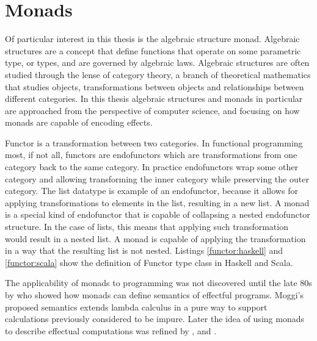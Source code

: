 



\section{Monads} \label{monads}
Of particular interest in this thesis is the algebraic structure monad. Algebraic structures are a concept that define functions that operate on some parametric type, or types, and are governed by algebraic laws. Algebraic structures are often studied through the lense of category theory, a branch of theoretical mathematics that studies objects, transformations between objects and relationships between different categories. In this thesis algebraic structures and monads in particular are approached from the perspective of computer science, and focusing on how monads are capable of encoding effects.

Functor is a transformation between two categories. In functional programming most, if not all, functors are endofunctors which are transformations from one category back to the same category. In practice endofunctors wrap some other category and allowing transforming the inner category while preserving the outer category. The list datatype is example of an endofunctor, because it allows for applying transformations to elements in the list, resulting in a new list. A monad is a special kind of endofunctor that is capable of collapsing a nested endofunctor structure. In the case of lists, this means that applying such transformation would result in a nested list. A monad is capable of applying the transformation in a way that the resulting list is not nested. Listings \ref{functor:haskell} and \ref{functor:scala} show the definition of Functor type class in Haskell and Scala.





The applicability of monads to programming was not discovered until the late 80s by \textcite{comp-lambda-monads} who showed how monads can define semantics of effectful programs. Moggi's proposed semantics extends lambda calculus in a pure way to support calculations previously considered to be impure. Later the idea of using monads to describe effectual computations was refined by \textcite{comprehending-monads}, \textcite{notions-computations} and \textcite{monads-for-fp}. 

